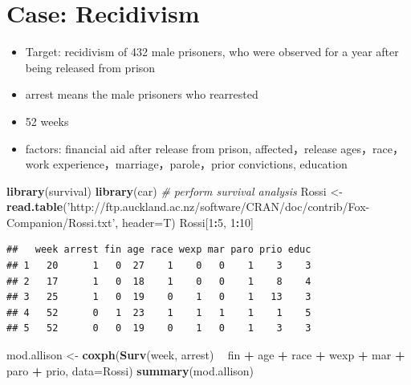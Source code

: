 \documentclass[]{book}
\newenvironment{Shaded}{\begin{snugshade}}{\end{snugshade}}
\newcommand{\CommentTok}[1]{\textcolor[rgb]{0.56,0.35,0.01}{\textit{#1}}}
\newcommand{\DataTypeTok}[1]{\textcolor[rgb]{0.13,0.29,0.53}{#1}}
\newcommand{\DecValTok}[1]{\textcolor[rgb]{0.00,0.00,0.81}{#1}}
\newcommand{\KeywordTok}[1]{\textcolor[rgb]{0.13,0.29,0.53}{\textbf{#1}}}
\newcommand{\NormalTok}[1]{#1}
\newcommand{\OperatorTok}[1]{\textcolor[rgb]{0.81,0.36,0.00}{\textbf{#1}}}
\newcommand{\StringTok}[1]{\textcolor[rgb]{0.31,0.60,0.02}{#1}}
\providecommand{\tightlist}{%
  \setlength{\itemsep}{0pt}\setlength{\parskip}{0pt}}
\begin{document}
\hypertarget{case-recidivism}{%
\section{Case: Recidivism}\label{case-recidivism}}

\begin{itemize}
\tightlist
\item
  Target: recidivism of 432 male prisoners, who were observed for a year after being released from prison
\item
  arrest means the male prisoners who rearrested
\item
  52 weeks
\item
  factors: financial aid after release from prison, affected，release ages，race，work experience，marriage，parole，prior convictions, education
\end{itemize}

\begin{Shaded}
\begin{Highlighting}[]
\KeywordTok{library}\NormalTok{(survival)}
\KeywordTok{library}\NormalTok{(car)}
\CommentTok{# perform survival analysis}
\NormalTok{Rossi <-}\StringTok{ }\KeywordTok{read.table}\NormalTok{(}\StringTok{'http://ftp.auckland.ac.nz/software/CRAN/doc/contrib/Fox-Companion/Rossi.txt'}\NormalTok{, }\DataTypeTok{header=}\NormalTok{T)}
\NormalTok{Rossi[}\DecValTok{1}\OperatorTok{:}\DecValTok{5}\NormalTok{, }\DecValTok{1}\OperatorTok{:}\DecValTok{10}\NormalTok{]}
\end{Highlighting}
\end{Shaded}

\begin{verbatim}
##   week arrest fin age race wexp mar paro prio educ
## 1   20      1   0  27    1    0   0    1    3    3
## 2   17      1   0  18    1    0   0    1    8    4
## 3   25      1   0  19    0    1   0    1   13    3
## 4   52      0   1  23    1    1   1    1    1    5
## 5   52      0   0  19    0    1   0    1    3    3
\end{verbatim}

\begin{Shaded}
\begin{Highlighting}[]
\NormalTok{mod.allison <-}\StringTok{ }\KeywordTok{coxph}\NormalTok{(}\KeywordTok{Surv}\NormalTok{(week, arrest) }\OperatorTok{~}\StringTok{ }\NormalTok{fin }\OperatorTok{+}\StringTok{ }\NormalTok{age }\OperatorTok{+}\StringTok{ }\NormalTok{race }\OperatorTok{+}\StringTok{ }\NormalTok{wexp }\OperatorTok{+}\StringTok{ }\NormalTok{mar }\OperatorTok{+}\StringTok{ }\NormalTok{paro }\OperatorTok{+}\StringTok{ }\NormalTok{prio, }\DataTypeTok{data=}\NormalTok{Rossi)}
\KeywordTok{summary}\NormalTok{(mod.allison)}
\end{Highlighting}
\end{Shaded}
\end{document}

